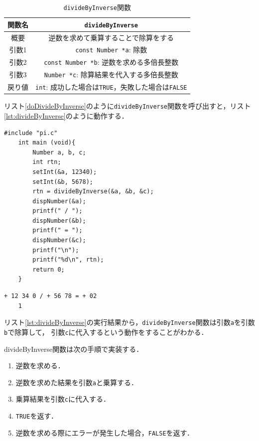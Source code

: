 \documentclass[a4paper,11pt,dvipdfmx]{jsarticle}
\begin{document}
\begin{table}[H]
\centering
\caption{\texttt{divideByInverse}関数}
\label{table:lst:divideByInverse}
\begin{tabular}{c||c}
\hline
関数名    & \texttt{divideByInverse}   \\
\hline
概要    & 逆数を求めて乗算することで除算をする   \\
\hline
引数1   & \texttt{const Number *a}: 除数  \\
引数2   & \texttt{const Number *b}: 逆数を求める多倍長整数  \\
引数3   & \texttt{Number *c}: 除算結果を代入する多倍長整数  \\
\hline
戻り値    & \texttt{int}: 成功した場合は\texttt{TRUE}，失敗した場合は\texttt{FALSE}   \\
\hline
\end{tabular}
\end{table}

リスト\ref{doDivideByInverse}のように\texttt{divideByInverse}関数を呼び出すと，リスト\ref{lst:divideByInverse}のように動作する．

\begin{lstlisting}[caption=\texttt{divideByInverse}関数の呼び出し,label=doDivideByInverse]
    #include "pi.c"
    int main (void){
        Number a, b, c;
        int rtn;
        setInt(&a, 12340);
        setInt(&b, 5678);
        rtn = divideByInverse(&a, &b, &c);
        dispNumber(&a);
        printf(" / ");
        dispNumber(&b);
        printf(" = ");
        dispNumber(&c);
        printf("\n");
        printf("%d\n", rtn);
        return 0;
    }
\end{lstlisting}

\begin{lstlisting}[caption=リスト\ref{doDivideByInverse}の実行結果,label=lst:divideByInverse]
    + 12 34 0 / + 56 78 = + 02
    1
\end{lstlisting}

リスト\ref{lst:divideByInverse}の実行結果から，\texttt{divideByInverse}関数は引数\texttt{a}を引数\texttt{b}で除算して，
引数\texttt{c}に代入するという動作をすることがわかる．

divideByInverse関数は次の手順で実装する．
\begin{enumerate}
    \item 逆数を求める．
    \item 逆数を求めた結果を引数\texttt{a}と乗算する．
    \item 乗算結果を引数\texttt{c}に代入する．
    \item \texttt{TRUE}を返す．
    \item 逆数を求める際にエラーが発生した場合，\texttt{FALSE}を返す．
\end{enumerate}
\end{document}
